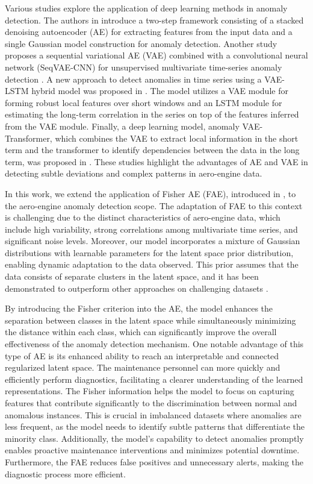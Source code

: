 \documentclass[journal]{IEEEtran}
\begin{document}
Various studies explore the application of deep learning methods in anomaly detection. The authors in \cite{deep1} introduce a two-step framework consisting of a stacked denoising autoencoder (AE) for extracting features from the input data and a single Gaussian model construction for anomaly detection. Another study proposes a sequential variational AE (VAE) combined with a convolutional neural network (SeqVAE-CNN) for unsupervised multivariate time-series anomaly detection \cite{deep3}. A new approach to detect anomalies in time series using a VAE-LSTM hybrid model was proposed in \cite{deep4}. The model utilizes a VAE module for forming robust local features over short windows and an LSTM module for estimating the long-term correlation in the series on top of the features inferred from the VAE module. Finally, a deep learning model, anomaly VAE-Transformer, which combines the VAE to extract local information in the short term and the transformer to identify dependencies between the data in the long term, was proposed in \cite{deep5}. These studies highlight the advantages of AE and VAE in detecting subtle deviations and complex patterns in aero-engine data.

In this work, we extend the application of Fisher AE (FAE), introduced in \cite{FAE}, to the aero-engine anomaly detection scope. The adaptation of FAE to this context is challenging due to the distinct characteristics of aero-engine data, which include high variability, strong correlations among multivariate time series, and significant noise levels. Moreover, our model incorporates a mixture of Gaussian distributions with learnable parameters for the latent space prior distribution, enabling dynamic adaptation to the data observed. This prior assumes that the data consists of separate clusters in the latent space, and it has been demonstrated to outperform other approaches on challenging datasets \cite{prior}.


By introducing the Fisher criterion into the AE, the model enhances the separation between classes in the latent space while simultaneously minimizing the distance within each class, which can significantly improve the overall effectiveness of the anomaly detection mechanism. One notable advantage of this type of AE is its enhanced ability to reach an interpretable and connected regularized latent space. The maintenance personnel can more quickly and efficiently perform diagnostics, facilitating a clearer understanding of the learned representations. The Fisher information helps the model to focus on capturing features that contribute significantly to the discrimination between normal and anomalous instances. This is crucial in imbalanced datasets where anomalies are less frequent, as the model needs to identify subtle patterns that differentiate the minority class. Additionally, the model's capability to detect anomalies promptly enables proactive maintenance interventions and minimizes potential downtime. Furthermore, the FAE reduces false positives and unnecessary alerts, making the diagnostic process more efficient.  
\end{document}
